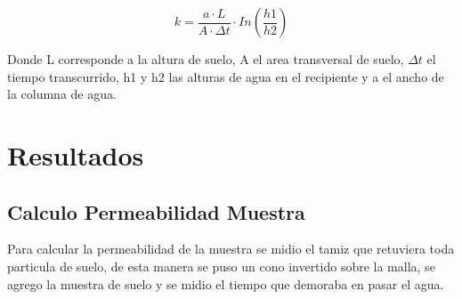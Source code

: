 \begin{equation}
    k = \frac{a \cdot L}{A \cdot \Delta t} \cdot In(\frac{h1}{h2})
\end{equation}

Donde L corresponde a la altura de suelo, A el area transversal de suelo, $\Delta t$ el tiempo transcurrido, h1 y h2 las alturas de agua en el recipiente y a el ancho de la columna de agua.

\section{Resultados}

\subsection{Calculo Permeabilidad Muestra}

Para calcular la permeabilidad de la muestra se midio el tamiz que retuviera toda particula de suelo, de esta manera se puso un cono invertido sobre la malla, se agrego la muestra de suelo y se midio el tiempo que demoraba en pasar el agua. 

